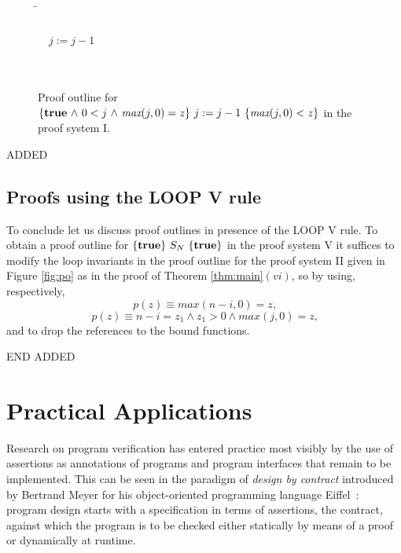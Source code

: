 \documentclass[runningheads]{llncs}       %
\begin{document}
 \begin{figure}[htbp]
 \begin{tabbing}
 \qquad\qquad    
\=       \\
\>                          \\
\>  \ \ $j:=j-1$                               \\
\>                             \\
\>                 \\
\end{tabbing}
\caption{Proof outline for $\mbox{$\{{\mbox{{\bf true}}\mbox{$\ \wedge\ $} 0<j\mbox{$\ \wedge\ $}  \mbox{\it max}(j,0)= z}\}\ {j:=j-1}\ \{{\mbox{\it max}(j,0) < z}\}$}$  in the proof system I.}
\label{fig:po3}

\end{figure}

ADDED

\subsection{Proofs using the LOOP V rule}

To conclude let us discuss proof outlines in presence of the LOOP V
rule.  To obtain a proof outline for $\mbox{$\{{\mbox{{\bf true}}}\}\ {S_N}\ \{{\mbox{{\bf true}}}\}$}$ in the
proof system V it suffices to modify the loop invariants in the proof
outline for the proof system II given in Figure \ref{fig:po} as in the
proof of Theorem \ref{thm:main}$(vi)$, so by using, respectively,
\[
  \mbox{$p(z) \equiv max(n - i, 0) = z$,}
\]
\[
  \mbox{$p(z) \equiv n - i = z_1 \land z_1 > 0 \land max(j, 0) = z$,}
\]
and to drop the references to the bound functions.


END ADDED
\section{Practical Applications}

Research on program verification has entered practice most visibly by
the use of assertions as annotations of programs and program
interfaces that remain to be implemented.  This can be seen in the
paradigm of \emph{design by contract} introduced by Bertrand Meyer for
his object-oriented programming language Eiffel~\cite{Mey97}: program
design starts with a specification in terms of assertions, the
contract, against which the program is to be checked either statically
by means of a proof or dynamically at runtime.
\end{document}
